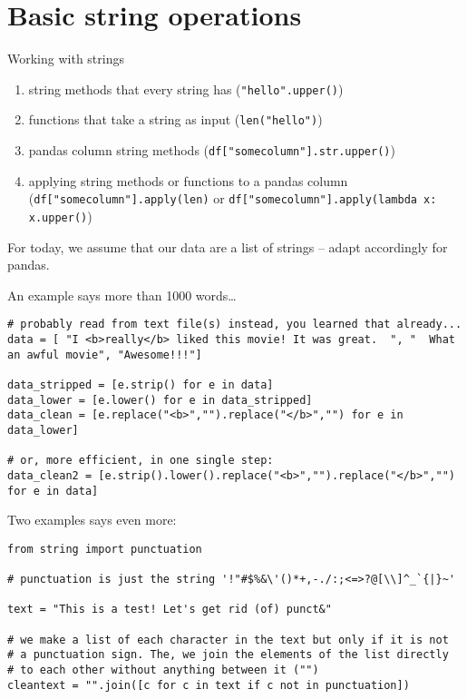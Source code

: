 \section{Basic string operations}

\begin{frame}{Working with strings}
\begin{enumerate}[<+->]
\item string methods that every string has (\texttt{"hello".upper()})
\item functions that take a string as input (\texttt{len("hello")})
\item pandas column string methods (\texttt{df["somecolumn"].str.upper()})
\item applying string methods or functions to a pandas column (\texttt{df["somecolumn"].apply(len)} or \texttt{df["somecolumn"].apply(lambda x: x.upper()})
\end{enumerate}

\pause
For today, we assume that our data are a list of strings -- adapt accordingly for pandas.
\end{frame}


\begin{frame}[fragile]{An example says more than 1000 words\ldots}
\begin{verbatim}
# probably read from text file(s) instead, you learned that already...
data = [ "I <b>really</b> liked this movie! It was great.  ", "  What an awful movie", "Awesome!!!"]

data_stripped = [e.strip() for e in data]
data_lower = [e.lower() for e in data_stripped]
data_clean = [e.replace("<b>","").replace("</b>","") for e in data_lower]

# or, more efficient, in one single step:
data_clean2 = [e.strip().lower().replace("<b>","").replace("</b>","") for e in data]
\end{verbatim}
\end{frame}



\begin{frame}[fragile]{Two examples says even more:}
\begin{verbatim}
from string import punctuation

# punctuation is just the string '!"#$%&\'()*+,-./:;<=>?@[\\]^_`{|}~'

text = "This is a test! Let's get rid (of) punct&"

# we make a list of each character in the text but only if it is not
# a punctuation sign. The, we join the elements of the list directly
# to each other without anything between it ("")
cleantext = "".join([c for c in text if c not in punctuation])
\end{verbatim}
\end{frame}


